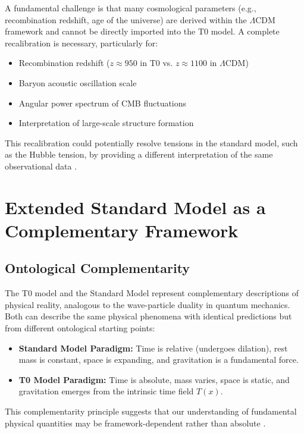 \documentclass[12pt,a4paper]{article}
\newcommand{\Tfield}{T(x)}
\newcommand{\LCDM}{\Lambda\text{CDM}}
\begin{document}
	A fundamental challenge is that many cosmological parameters (e.g., recombination redshift, age of the universe) are derived within the \(\LCDM\) framework and cannot be directly imported into the T0 model. A complete recalibration is necessary, particularly for:
	
	\begin{itemize}
		\item Recombination redshift (\(z \approx 950\) in T0 vs. \(z \approx 1100\) in \(\LCDM\))
		\item Baryon acoustic oscillation scale
		\item Angular power spectrum of CMB fluctuations
		\item Interpretation of large-scale structure formation
	\end{itemize}
	
	This recalibration could potentially resolve tensions in the standard model, such as the Hubble tension, by providing a different interpretation of the same observational data \cite{DiValentino2021}.
	
	\section{Extended Standard Model as a Complementary Framework}
	\label{sec:extended_standard_model}
	
	\subsection{Ontological Complementarity}
	\label{subsec:ontological_complementarity}
	
	The T0 model and the Standard Model represent complementary descriptions of physical reality, analogous to the wave-particle duality in quantum mechanics. Both can describe the same physical phenomena with identical predictions but from different ontological starting points:
	
	\begin{itemize}
		\item \textbf{Standard Model Paradigm:} Time is relative (undergoes dilation), rest mass is constant, space is expanding, and gravitation is a fundamental force.
		\item \textbf{T0 Model Paradigm:} Time is absolute, mass varies, space is static, and gravitation emerges from the intrinsic time field \(\Tfield\).
	\end{itemize}
	
	This complementarity principle suggests that our understanding of fundamental physical quantities may be framework-dependent rather than absolute \cite{pascher_komplementaer_2025}.
	
\end{document}
